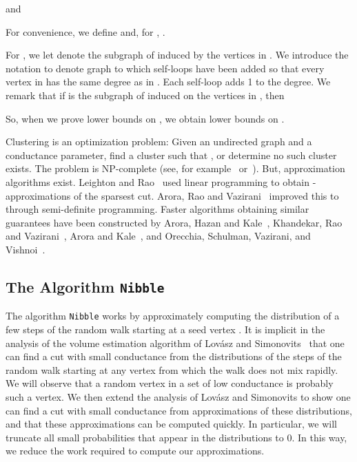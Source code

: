 \documentclass[11pt]{article}
\begin{document}
and

For convenience, we define  and, for ,
  .

For , we let  denote the subgraph of  induced by
  the vertices in .
We introduce the notation  to denote graph  to which self-loops
  have been added so that every vertex in  has the same degree
  as in .
Each self-loop adds 1 to the degree.
We remark that if  is the subgraph of  induced on the
  vertices in , then

So, when we prove lower bounds on , we obtain lower
  bounds on .

Clustering is an optimization problem:
Given an undirected graph  and
   a conductance parameter, find a cluster  such that
   , or determine no such cluster exists.
The problem is  NP-complete (see, for example~\cite{LeightonRao}
  or~\cite{NPcompleteCluster}).
But, approximation algorithms exist.
Leighton and Rao~\cite{LeightonRao} used linear programming to obtain
 -approximations of the sparsest cut.
Arora, Rao and Vazirani~\cite{AroraRaoVazirani} improved this to 
  through semi-definite programming.
Faster algorithms obtaining similar guarantees have been constructed by
  Arora, Hazan and Kale~\cite{AroraHazanKale},
  Khandekar, Rao and Vazirani~\cite{KhandekarRaoVazirani},
  Arora and Kale~\cite{AroraKale}, and
  Orecchia, Schulman, Vazirani, and Vishnoi~\cite{Orecchia}.



\subsection{The Algorithm \texttt{Nibble}}

The algorithm
  \texttt{Nibble}
  works by approximately computing the distribution
  of a few steps of the random walk starting at a
  seed vertex .
It is implicit in the analysis of the volume
  estimation algorithm of Lov\'asz and
  Simonovits~\cite{LovaszSimonovits}
  that one can find a cut with small conductance from the distributions
  of the steps of the
  random walk starting at any vertex from which
  the walk does not mix rapidly.
We will observe that a random vertex in a set of low conductance
  is probably such a vertex.
We then extend the analysis of Lov\'asz and Simonovits
  to show one can find a cut with small conductance from approximations
  of these distributions, and that
  these approximations can be computed quickly.
In particular, we will truncate all
  small probabilities that appear in the distributions to 0.
In this way, we reduce the work required to
  compute our approximations.
\end{document}
